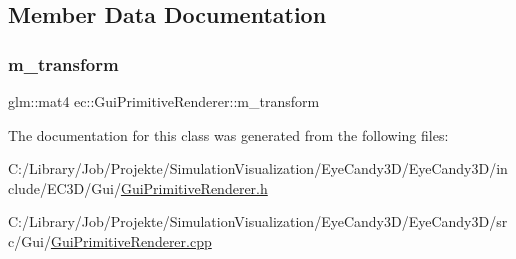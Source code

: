 \subsection{Member Data Documentation}
\mbox{\label{classec_1_1_gui_primitive_renderer_a7ebd149e4d4e0b043d928391041000bf}} 
\subsubsection{\texorpdfstring{m\+\_\+transform}{m\_transform}}
{\footnotesize\ttfamily glm\+::mat4 ec\+::\+Gui\+Primitive\+Renderer\+::m\+\_\+transform\hspace{0.3cm}{\ttfamily [protected]}}



The documentation for this class was generated from the following files\+:\begin{DoxyCompactItemize}
\item 
C\+:/\+Library/\+Job/\+Projekte/\+Simulation\+Visualization/\+Eye\+Candy3\+D/\+Eye\+Candy3\+D/include/\+E\+C3\+D/\+Gui/\mbox{\hyperlink{_gui_primitive_renderer_8h}{Gui\+Primitive\+Renderer.\+h}}\item 
C\+:/\+Library/\+Job/\+Projekte/\+Simulation\+Visualization/\+Eye\+Candy3\+D/\+Eye\+Candy3\+D/src/\+Gui/\mbox{\hyperlink{_gui_primitive_renderer_8cpp}{Gui\+Primitive\+Renderer.\+cpp}}\end{DoxyCompactItemize}
